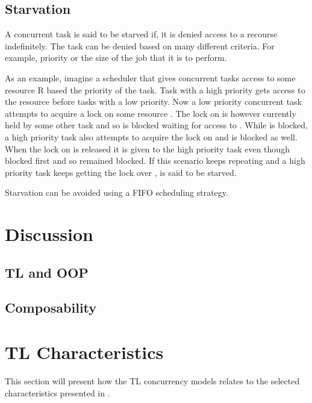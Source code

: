 \subsection{Starvation}
A concurrent task is said to be starved if, it is denied access to a recourse indefinitely\cite[p. 459]{tanenbaum2008modern}. The task can be denied based on many different criteria. For example, priority or the size of the job that it is to perform.

As an example, imagine a scheduler that gives concurrent tasks access to some resource R based the priority of the task. Task with a high priority gets access to the resource before tasks with a low priority. Now a low priority concurrent task  attempts to acquire a lock on some resource . The lock on  is however currently held by some other task and so  is blocked waiting for access to . While  is blocked, a high priority task  also attempts to acquire the lock on  and is blocked as well. When the lock on  is released it is given to the high priority task  even though  blocked first and so  remained blocked. If this scenario keeps repeating and a high priority task keeps getting the lock over ,  is said to be starved.


Starvation can be avoided using a \ac{FIFO} scheduling strategy\cite[p. 459]{tanenbaum2008modern}.

\section{Discussion}
\subsection{\ac{TL} and OOP}

\subsection{Composability}


\section{\acl{TL} Characteristics}
This section will present how the \ac{TL} concurrency models relates to the selected characteristics presented in .



\worksheetend
